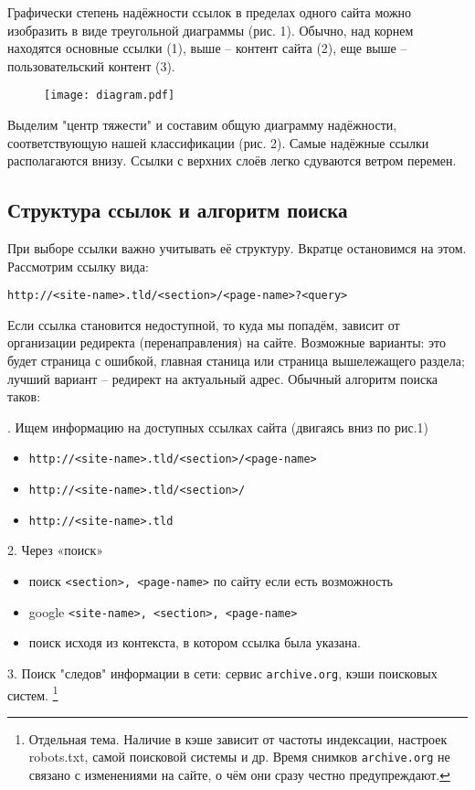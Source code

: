 \documentclass[10pt, a5paper]{article}
\begin{document}
Графически степень надёжности ссылок в пределах 
одного сайта можно изобразить в виде треугольной диаграммы (рис. 1).
Обычно, над корнем находятся основные ссылки (1), 
выше -- контент сайта (2),
еще выше -- пользовательский контент (3).   

\begin{figure}[h!]
  \centering
  \texttt{[image: diagram.pdf]}
\end{figure}

Выделим "центр тяжести" и составим общую диаграмму надёжности, 
соответствующую нашей классификации (рис. 2). 
Самые надёжные ссылки располагаются внизу. Ссылки с верхних слоёв 
легко сдуваются ветром перемен.

\subsection*{Структура ссылок и алгоритм поиска}

При выборе ссылки важно учитывать её структуру. Вкратце остановимся на этом.
Рассмотрим ссылку вида:

\texttt{http://<site-name>.tld/<section>/<page-name>?<query>}

Если ссылка становится недоступной, то куда мы попадём,  зависит  от
организации  редиректа   (перенаправления)   на   сайте.   Возможные
варианты: это  будет  страница с ошибкой,  главная  станица  или
страница  вышележащего  раздела;  лучший  вариант  –   редирект   на
актуальный адрес. Обычный алгоритм поиска таков:

. Ищем информацию на доступных ссылках сайта (двигаясь вниз по рис.1)
\begin{itemize}
\item \texttt{http://<site-name>.tld/<section>/<page-name>}
\item \texttt{http://<site-name>.tld/<section>/}
\item \texttt{http://<site-name>.tld}
\end{itemize}
2. Через «поиск»
\begin{itemize}
\item поиск \texttt{<section>, <page-name>} по сайту если есть возможность
\item google \texttt{<site-name>, <section>, <page-name>}
\item поиск исходя из контекста, в котором ссылка была указана.
\end{itemize}
3. Поиск "следов" информации в сети: сервис 
\texttt{archive.org}, кэши поисковых систем. 
\footnote{Отдельная тема. Наличие в кэше зависит 
от частоты индексации, настроек robots.txt, самой поисковой системы и др.
Время снимков \texttt{archive.org} не связано с изменениями на сайте, о чём они 
сразу честно предупреждают.}
\end{document}
